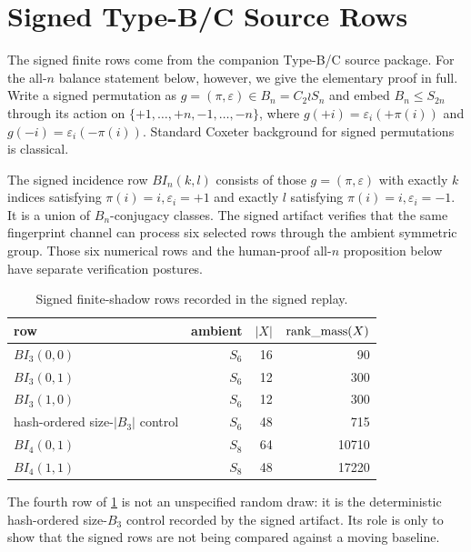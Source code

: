 \section{Signed Type-B/C Source Rows}

The signed finite rows come from the companion Type-B/C source package.  For
the all-\(n\) balance statement below, however, we give the elementary proof in
full.  Write a signed permutation as \(g=(\pi,\varepsilon)\in B_n=C_2\wr S_n\)
and embed \(B_n\leq S_{2n}\) through its action on
\(\{+1,\ldots,+n,-1,\ldots,-n\}\), where
\(g(+i)=\varepsilon_i(+\pi(i))\) and \(g(-i)=\varepsilon_i(-\pi(i))\).
Standard Coxeter background for signed permutations is classical\cite{BjornerBrenti2005}.

The signed incidence row \(BI_n(k,l)\) consists of those
\(g=(\pi,\varepsilon)\) with exactly \(k\) indices satisfying
\(\pi(i)=i,\varepsilon_i=+1\) and exactly \(l\) satisfying
\(\pi(i)=i,\varepsilon_i=-1\).  It is a union of \(B_n\)-conjugacy classes.
The signed artifact verifies that the same fingerprint channel can process six
selected rows through the ambient symmetric group.  Those six numerical rows
and the human-proof all-\(n\) proposition below have separate verification
postures.

\begin{table}[ht]
\centering
\caption{Signed finite-shadow rows recorded in the signed replay.}
\label{tab:signed-rankmass}
\begin{tabular}{@{}lrrr@{}}
\toprule
row & ambient & \(|X|\) & \(\operatorname{rank\_mass}(X)\) \\
\midrule
\(BI_3(0,0)\) & \(S_6\) & 16 & 90 \\
\(BI_3(0,1)\) & \(S_6\) & 12 & 300 \\
\(BI_3(1,0)\) & \(S_6\) & 12 & 300 \\
hash-ordered size-\(|B_3|\) control & \(S_6\) & 48 & 715 \\
\(BI_4(0,1)\) & \(S_8\) & 64 & 10710 \\
\(BI_4(1,1)\) & \(S_8\) & 48 & 17220 \\
\bottomrule
\end{tabular}
\end{table}

The fourth row of \cref{tab:signed-rankmass} is not an unspecified random draw: it is the deterministic hash-ordered size-\(B_3\) control recorded by the signed artifact.  Its role is only to show that the signed rows are not being compared against a moving baseline.

